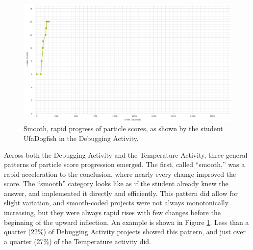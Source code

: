 \begin{figure}
	\centering
	\includegraphics[width=\textwidth]{images/stories/scores-debug-UfaDogfish}
	\caption[Smooth, Rapid Progress of Particle Scores]{Smooth, rapid progress of particle scores, as shown by the student UfaDogfish in the Debugging Activity.}
	\label{fig:smooth_chart}
\end{figure}
Across both the Debugging Activity and the Temperature Activity, three general patterns of particle score progression emerged. The first, called ``smooth,'' was a rapid acceleration to the conclusion, where nearly every change improved the score. The ``smooth'' category looks like as if the student already knew the answer, and implemented it directly and efficiently. This pattern did allow for slight variation, and smooth-coded projects were not always monotonically increasing, but they were always rapid rises with few changes before the beginning of the upward inflection. An example is shown in Figure \ref{fig:smooth_chart}. Less than a quarter (22\%) of Debugging Activity projects showed this pattern, and just over a quarter (27\%) of the Temperature activity did.

